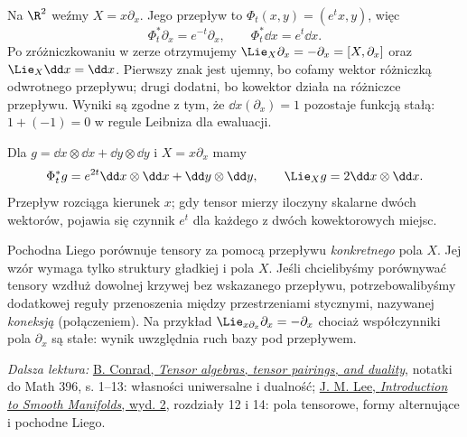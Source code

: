 \begin{przyklad}
Na $\R^2$ weźmy $X=x\partial_x$. Jego przepływ to
$\Phi_t(x,y)=(e^tx,y)$, więc
\[
 \Phi_t^*\partial_x=e^{-t}\partial_x,
 \qquad \Phi_t^*\dd x=e^t\dd x.
\]
Po zróżniczkowaniu w zerze otrzymujemy
$\Lie_X\partial_x=-\partial_x=[X,\partial_x]$
oraz $\Lie_X\dd x=\dd x$. Pierwszy znak jest ujemny,
bo cofamy wektor różniczką odwrotnego przepływu;
drugi dodatni, bo kowektor działa na różniczce przepływu.
Wyniki są zgodne z tym, że $\dd x(\partial_x)=1$
pozostaje funkcją stałą: $1+(-1)=0$ w regule
Leibniza dla ewaluacji.
\end{przyklad}

\begin{przyklad}
Dla $g=\dd x\otimes\dd x+\dd y\otimes\dd y$ i
$X=x\partial_x$ mamy
\[
 \Phi_t^*g=e^{2t}\dd x\otimes\dd x
             +\dd y\otimes\dd y,\qquad
 \Lie_Xg=2\dd x\otimes\dd x.
\]
Przepływ rozciąga kierunek $x$; gdy tensor mierzy
iloczyny skalarne dwóch wektorów, pojawia się czynnik
$e^t$ dla każdego z dwóch kowektorowych miejsc.
\end{przyklad}

\begin{uwaga}
Pochodna Liego porównuje tensory za pomocą przepływu
\emph{konkretnego} pola $X$. Jej wzór wymaga tylko struktury
gładkiej i pola $X$. Jeśli chcielibyśmy porównywać tensory
wzdłuż dowolnej krzywej bez wskazanego przepływu,
potrzebowalibyśmy dodatkowej reguły przenoszenia między
przestrzeniami stycznymi, nazywanej \emph{koneksją} (połączeniem).
Na przykład $\Lie_{x\partial_x}\partial_x=-\partial_x$
chociaż współczynniki pola $\partial_x$ są stałe:
wynik uwzględnia ruch bazy pod przepływem.
\end{uwaga}

\par\smallskip
{\footnotesize\noindent\emph{Dalsza lektura:}
\href{https://math.stanford.edu/~conrad/diffgeomPage/handouts/tensor.pdf}
{B. Conrad, \emph{Tensor algebras, tensor pairings, and duality}},
notatki do Math 396, s. 1--13: własności uniwersalne i dualność;
\href{https://doi.org/10.1007/978-1-4419-9982-5}
{J. M. Lee, \emph{Introduction to Smooth Manifolds}, wyd. 2},
rozdziały 12 i 14: pola tensorowe, formy alternujące
i pochodne Liego.\par}
\clearpage
